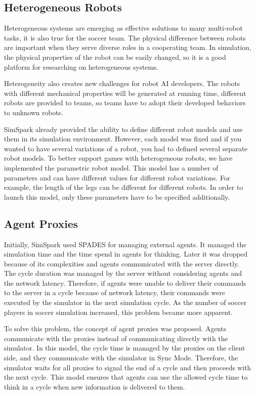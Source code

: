 \documentclass{llncs}
\begin{document}
\subsection{Heterogeneous Robots}
Heterogeneous systems are emerging as effective solutions to many multi-robot tasks,
it is also true for the soccer team. The physical difference between robots are important when they serve diverse roles in a cooperating team.
In simulation, the physical properties of the robot can be easily changed, so it is a good platform for researching on heterogeneous systems.

Heterogeneity also creates new challenges for robot AI developers.
The robots with different mechanical properties will be generated at running time,
different robots are provided to teams, so teams have to adopt their developed behaviors to unknown robots.

SimSpark already provided the ability to define different robot models and 
use them in its simulation environment. However, each model was fixed and if you
wanted to have several variations of a robot, you had to defined several 
separate robot models. To better support games with heterogeneous robots, we have
implemented the parametric robot model. 
This model has a number of parameters and can have different values for different robot variations. For example, the length of the legs can be different for different robots.
In order to launch this model, only these parameters have to be specified additionally.

\subsection{Agent Proxies}
Initially, SimSpark used SPADES\cite{riley2003spades} for managing external agents. It
managed the simulation time and the time spend in agents for thinking. Later it was
dropped because of its complexities and agents communicated with the server directly.
The cycle duration was managed by the server without considering agents and the network
latency. Therefore, if agents were unable to deliver their commands to the server in a
cycle because of network latency, their commands were executed by the simulator
in the next simulation cycle. As the number of soccer players in soccer simulation 
increased, this problem became more apparent.

To solve this problem, the concept of agent proxies was proposed.
Agents communicate with the proxies instead of 
communicating directly with the simulator. In this model, the cycle time is managed
by the proxies on the client side, and they communicate with the simulator in Sync Mode.
Therefore, the simulator waits for all proxies to signal the end of a cycle and 
then proceeds with the next cycle. This model ensures that agents can use the allowed
cycle time to think in a cycle when new information is delivered to them. 
\end{document}
